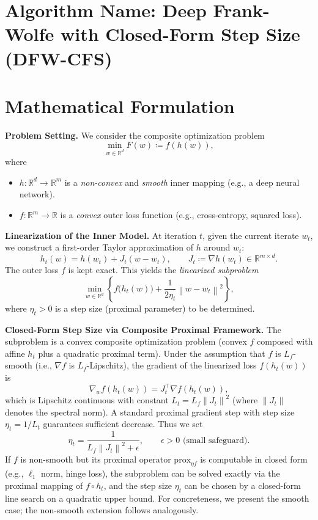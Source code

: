 \documentclass{article}
\newcommand{\R}{\mathbb{R}}
\newcommand{\norm}[1]{\left\| #1 \right\|}
\newcommand{\prox}{\text{prox}}
\begin{document}
\section*{Algorithm Name: Deep Frank-Wolfe with Closed-Form Step Size (DFW-CFS)}

\section*{Mathematical Formulation}

\textbf{Problem Setting.} We consider the composite optimization problem
\begin{equation}
    \min_{w \in \R^d} F(w) \coloneqq f(h(w)),
\end{equation}
where
\begin{itemize}
    \item $h: \R^d \to \R^m$ is a \textit{non-convex} and \textit{smooth} inner mapping (e.g., a deep neural network).
    \item $f: \R^m \to \R$ is a \textit{convex} outer loss function (e.g., cross-entropy, squared loss).
\end{itemize}

\textbf{Linearization of the Inner Model.} At iteration $t$, given the current iterate $w_t$, we construct a first-order Taylor approximation of $h$ around $w_t$:
\begin{equation}
    h_t(w) = h(w_t) + J_t (w - w_t), \qquad J_t \coloneqq \nabla h(w_t) \in \R^{m \times d}.
\end{equation}
The outer loss $f$ is kept exact. This yields the \textit{linearized subproblem}
\begin{equation}
    \min_{w \in \R^d} \left\{ f\bigl( h_t(w) \bigr) + \frac{1}{2\eta_t} \norm{w - w_t}^2 \right\},
\end{equation}
where $\eta_t > 0$ is a step size (proximal parameter) to be determined.

\textbf{Closed-Form Step Size via Composite Proximal Framework.} The subproblem is a convex composite optimization problem (convex $f$ composed with affine $h_t$ plus a quadratic proximal term). Under the assumption that $f$ is $L_f$-smooth (i.e., $\nabla f$ is $L_f$-Lipschitz), the gradient of the linearized loss $f(h_t(w))$ is
\begin{equation}
    \nabla_w f(h_t(w)) = J_t^\top \nabla f(h_t(w)),
\end{equation}
which is Lipschitz continuous with constant $L_t = L_f \norm{J_t}^2$ (where $\norm{J_t}$ denotes the spectral norm). A standard proximal gradient step with step size $\eta_t = 1/L_t$ guarantees sufficient decrease. Thus we set
\begin{equation}
    \eta_t = \frac{1}{L_f \norm{J_t}^2 + \epsilon}, \qquad \epsilon > 0 \text{ (small safeguard)}.
\end{equation}
If $f$ is non-smooth but its proximal operator $\prox_{\eta f}$ is computable in closed form (e.g., $\ell_1$ norm, hinge loss), the subproblem can be solved exactly via the proximal mapping of $f \circ h_t$, and the step size $\eta_t$ can be chosen by a closed-form line search on a quadratic upper bound. For concreteness, we present the smooth case; the non-smooth extension follows analogously.
\end{document}

